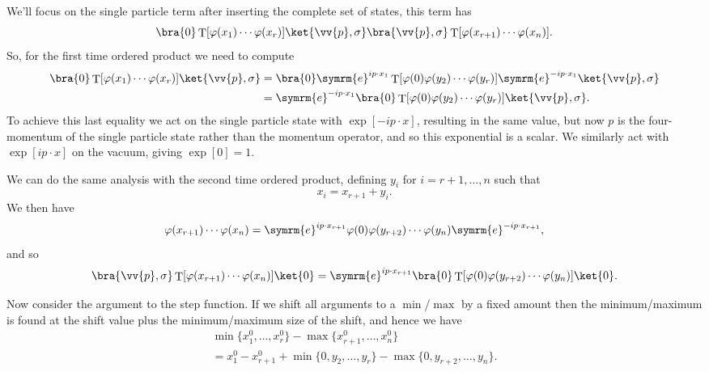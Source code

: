 \documentclass[fleqn]{NotesClass}
\newcommand{\e}{\symrm{e}}
\DeclareMathOperator{\timeOrdering}{T}
\begin{document}
    We'll focus on the single particle term after inserting the complete set of states, this term has
    \begin{equation}
        \bra{0} \timeOrdering[\varphi(x_1) \dotsm \varphi(x_r)] \ket{\vv{p}, \sigma} \bra{\vv{p}, \sigma} \timeOrdering[\varphi(x_{r+1}) \dotsm \varphi(x_n)].
    \end{equation}
    So, for the first time ordered product we need to compute
    \begin{align}
        \bra{0} \timeOrdering[\varphi(x_1) \dotsm \varphi(x_r)] \ket{\vv{p}, \sigma} &= \bra{0} \e^{ip \cdot x_1} \timeOrdering[\varphi(0)\varphi(y_2) \dotsm \varphi(y_r)] \e^{-ip\cdot x_1} \ket{\vv{p}, \sigma} \notag\\
        &= \e^{-ip\cdot x_1} \bra{0} \timeOrdering[\varphi(0)\varphi(y_2) \dotsm \varphi(y_r)] \ket{\vv{p}, \sigma}.
    \end{align}
    To achieve this last equality we act on the single particle state with \(\exp[-ip \cdot x]\), resulting in the same value, but now \(p\) is the four-momentum of the single particle state rather than the momentum operator, and so this exponential is a scalar.
    We similarly act with \(\exp[ip\cdot x]\) on the vacuum, giving \(\exp[0] = 1\).
    
    We can do the same analysis with the second time ordered product, defining \(y_i\) for \(i = r + 1, \dotsc, n\) such that 
    \begin{equation}
        x_i = x_{r + 1} + y_i.
    \end{equation}
    We then have
    \begin{equation}
        \varphi(x_{r + 1}) \dotsm \varphi(x_n) = \e^{ip\cdot x_{r+1}} \varphi(0)\varphi(y_{r+2}) \dotsm \varphi(y_n) \e^{-ip\cdot x_{r+1}},
    \end{equation}
    and so
    \begin{equation}
        \bra{\vv{p}, \sigma} \timeOrdering[\varphi(x_{r+1}) \dotsm \varphi(x_n)] \ket{0} = \e^{ip\cdot x_{r+1}} \bra{0} \timeOrdering[\varphi(0) \varphi(y_{r+2}) \dotsm \varphi(y_{n})] \ket{0}.
    \end{equation}
    
    Now consider the argument to the step function.
    If we shift all arguments to a \(\min\)/\(\max\) by a fixed amount then the minimum/maximum is found at the shift value plus the minimum/maximum size of the shift, and hence we have
    \begin{multline}
        \min\{x_1^0, \dotsc, x_r^0\} - \max\{x_{r+1}^0, \dotsc, x_n^0\}\\
        = x_1^0 - x_{r+1}^0 + \min\{0, y_2, \dotsc, y_r\} - \max\{0, y_{r+2}, \dotsc, y_n\}.
    \end{multline}
    
\end{document}
